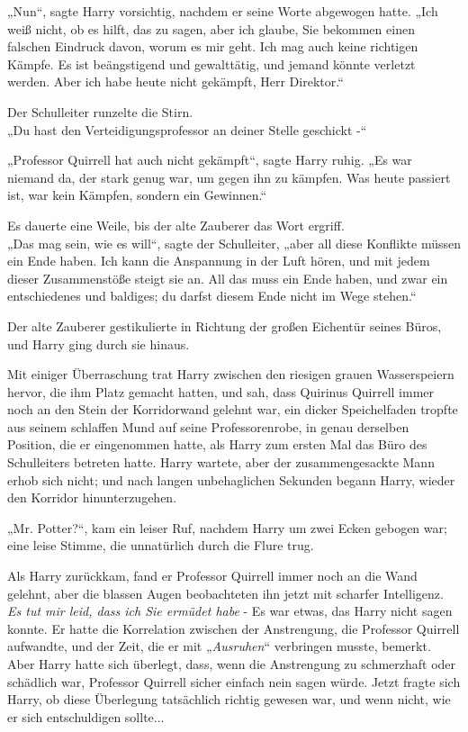 {„Nun“, sagte Harry vorsichtig, nachdem er seine Worte abgewogen hatte. „Ich weiß nicht, ob es hilft, das zu sagen, aber ich glaube, Sie bekommen einen falschen Eindruck davon, worum es mir geht. Ich mag auch keine richtigen Kämpfe. Es ist beängstigend und gewalttätig, und jemand könnte verletzt werden. Aber ich habe heute nicht gekämpft, Herr Direktor.“

Der Schulleiter runzelte die Stirn.\\ „Du hast den Verteidigungsprofessor an deiner Stelle geschickt -“

„Professor Quirrell hat auch nicht gekämpft“, sagte Harry ruhig. „Es war niemand da, der stark genug war, um gegen ihn zu kämpfen. Was heute passiert ist, war kein Kämpfen, sondern ein Gewinnen.“

Es dauerte eine Weile, bis der alte Zauberer das Wort ergriff.\\ „Das mag sein, wie es will“, sagte der Schulleiter, „aber all diese Konflikte müssen ein Ende haben. Ich kann die Anspannung in der Luft hören, und mit jedem dieser Zusammenstöße steigt sie an. All das muss ein Ende haben, und zwar ein entschiedenes und baldiges; du darfst diesem Ende nicht im Wege stehen.“

Der alte Zauberer gestikulierte in Richtung der großen Eichentür seines Büros, und Harry ging durch sie hinaus.

Mit einiger Überraschung trat Harry zwischen den riesigen grauen Wasserspeiern hervor, die ihm Platz gemacht hatten, und sah, dass Quirinus Quirrell immer noch an den Stein der Korridorwand gelehnt war, ein dicker Speichelfaden tropfte aus seinem schlaffen Mund auf seine Professorenrobe, in genau derselben Position, die er eingenommen hatte, als Harry zum ersten Mal das Büro des Schulleiters betreten hatte. Harry wartete, aber der zusammengesackte Mann erhob sich nicht; und nach langen unbehaglichen Sekunden begann Harry, wieder den Korridor hinunterzugehen.

„Mr. Potter?“, kam ein leiser Ruf, nachdem Harry um zwei Ecken gebogen war; eine leise Stimme, die unnatürlich durch die Flure trug.

Als Harry zurückkam, fand er Professor Quirrell immer noch an die Wand gelehnt, aber die blassen Augen beobachteten ihn jetzt mit scharfer Intelligenz.\\ \emph{Es tut mir leid, dass ich Sie ermüdet habe} - Es war etwas, das Harry nicht sagen konnte. Er hatte die Korrelation zwischen der Anstrengung, die Professor Quirrell aufwandte, und der Zeit, die er mit „\emph{Ausruhen}“ verbringen musste, bemerkt. Aber Harry hatte sich überlegt, dass, wenn die Anstrengung zu schmerzhaft oder schädlich war, Professor Quirrell sicher einfach nein sagen würde. Jetzt fragte sich Harry, ob diese Überlegung tatsächlich richtig gewesen war, und wenn nicht, wie er sich entschuldigen sollte...

}
